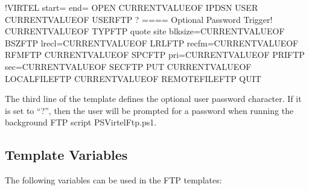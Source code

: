 \documentclass[letterpaper,10pt,english]{sphinxmanual}
\begin{document}
\begin{sphinxVerbatim}[commandchars=\\\{\}]
\PYGZlt{}!\PYGZhy{}\PYGZhy{}VIRTEL start=\PYGZdq{}\PYGZob{}\PYGZob{}\PYGZob{}\PYGZdq{} end=\PYGZdq{}\PYGZcb{}\PYGZcb{}\PYGZcb{}\PYGZdq{} \PYGZhy{}\PYGZhy{}\PYGZgt{}OPEN \PYGZob{}\PYGZob{}\PYGZob{}CURRENT\PYGZhy{}VALUE\PYGZhy{}OF \PYGZdq{}IPDSN\PYGZdq{}\PYGZcb{}\PYGZcb{}\PYGZcb{}
USER \PYGZob{}\PYGZob{}\PYGZob{}CURRENT\PYGZhy{}VALUE\PYGZhy{}OF \PYGZdq{}USERFTP\PYGZdq{}\PYGZcb{}\PYGZcb{}\PYGZcb{}
?                                                                           \PYGZlt{}==== Optional Password Trigger!
\PYGZob{}\PYGZob{}\PYGZob{}CURRENT\PYGZhy{}VALUE\PYGZhy{}OF \PYGZdq{}TYPFTP\PYGZdq{}\PYGZcb{}\PYGZcb{}\PYGZcb{}
quote site blksize=\PYGZob{}\PYGZob{}\PYGZob{}CURRENT\PYGZhy{}VALUE\PYGZhy{}OF \PYGZdq{}BSZFTP\PYGZdq{}\PYGZcb{}\PYGZcb{}\PYGZcb{} lrecl=\PYGZob{}\PYGZob{}\PYGZob{}CURRENT\PYGZhy{}VALUE\PYGZhy{}OF \PYGZdq{}LRLFTP\PYGZdq{}\PYGZcb{}\PYGZcb{}\PYGZcb{} recfm=\PYGZob{}\PYGZob{}\PYGZob{}CURRENT\PYGZhy{}VALUE\PYGZhy{}OF \PYGZdq{}RFMFTP\PYGZdq{}\PYGZcb{}\PYGZcb{}\PYGZcb{}
\PYGZob{}\PYGZob{}\PYGZob{}CURRENT\PYGZhy{}VALUE\PYGZhy{}OF \PYGZdq{}SPCFTP\PYGZdq{}\PYGZcb{}\PYGZcb{}\PYGZcb{} pri=\PYGZob{}\PYGZob{}\PYGZob{}CURRENT\PYGZhy{}VALUE\PYGZhy{}OF \PYGZdq{}PRIFTP\PYGZdq{}\PYGZcb{}\PYGZcb{}\PYGZcb{} sec=\PYGZob{}\PYGZob{}\PYGZob{}CURRENT\PYGZhy{}VALUE\PYGZhy{}OF \PYGZdq{}SECFTP\PYGZdq{}\PYGZcb{}\PYGZcb{}\PYGZcb{}
PUT \PYGZob{}\PYGZob{}\PYGZob{}CURRENT\PYGZhy{}VALUE\PYGZhy{}OF \PYGZdq{}LOCALFILEFTP\PYGZdq{}\PYGZcb{}\PYGZcb{}\PYGZcb{} \PYGZob{}\PYGZob{}\PYGZob{}CURRENT\PYGZhy{}VALUE\PYGZhy{}OF \PYGZdq{}REMOTEFILEFTP\PYGZdq{}\PYGZcb{}\PYGZcb{}\PYGZcb{}
QUIT
\end{sphinxVerbatim}

The third line of the template defines the optional user password character. If it is set to “?”, then the user will be prompted for a password when running the background FTP script PSVirtelFtp.ps1.


\subsection{Template Variables}
\label{\detokenize{Customization:template-variables}}
The following variables can be used in the FTP templates:
\end{document}
